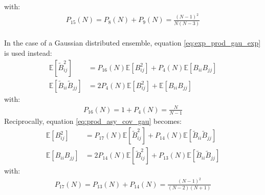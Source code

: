 \documentclass[12pt]{scrartcl}
\begin{document}
with:
\begin{align}
P_{15}(N) = P_8(N) + P_9(N) =  \frac{(N-1)^2}{N(N-3)}
\end{align}
$  $\\
In the case of a Gaussian distributed ensemble, equation \eqref{eq:exp_prod_gau_exp} is used instead:
\begin{subequations}
\begin{align}
\label{eq:exp_prod_gau_exp_2}
\mathbb{E} \left[\widetilde{B}_{ij}^2\right] & = P_{16}(N) \mathbb{E} \left[B^2_{ij}\right] + P_4(N) \mathbb{E} \left[B_{ii} B_{jj}\right] \\
\label{eq:exp_prod_gau_exp_3}
\mathbb{E} \left[\widetilde{B}_{ii} \widetilde{B}_{jj}\right] & = 2 P_4(N) \mathbb{E} \left[B^2_{ij}\right] + \mathbb{E} \left[B_{ii} B_{jj}\right]
\end{align}
\end{subequations}
with:
\begin{align}
P_{16}(N) = 1 + P_4(N) = \frac{N}{N-1}
\end{align}
Reciprocally, equation \eqref{eq:prod_asy_cov_gau} becomes:
\begin{subequations}
\begin{align}
\label{eq:prod_asy_cov_gau_exp_2}
\mathbb{E} \left[B^2_{ij}\right] & = P_{17}(N) \mathbb{E} \left[ \widetilde{B}_{ij}^2 \right] + P_{14}(N) \mathbb{E} \left[\widetilde{B}_{ii} \widetilde{B}_{jj} \right] \\
\label{eq:prod_asy_cov_gau_exp_3}
\mathbb{E} \left[B_{ii} B_{jj}\right] & = 2 P_{14}(N) \mathbb{E} \left[\widetilde{B}_{ij}^2\right] + P_{13}(N) \mathbb{E} \left[\widetilde{B}_{ii} \widetilde{B}_{jj}\right]
\end{align}
\end{subequations}
with:
\begin{align}
P_{17}(N) = P_{13}(N) + P_{14}(N) = \frac{(N-1)^2}{(N-2)(N+1)}
\end{align}
\end{document}
